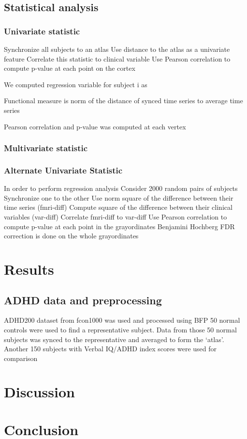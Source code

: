 \documentclass[preprint,12pt]{elsarticle}
\begin{document}
\subsection{Statistical analysis}
\subsubsection{Univariate statistic}
Synchronize all subjects to an atlas
Use distance to the atlas as a univariate feature
Correlate this statistic to clinical variable
Use Pearson correlation to compute p-value at each point on the cortex

We computed regression variable for subject i as 

Functional measure is norm of the distance of synced time series to average time series

Pearson correlation and p-value was computed at each vertex

\subsubsection{Multivariate statistic}

\subsubsection{Alternate Univariate Statistic}

In order to perform regression analysis
Consider 2000 random pairs of subjects
Synchronize one to the other 
Use norm square of the difference between their time series (fmri-diff)
Compute square of the difference between their clinical variables (var-diff)
Correlate fmri-diff to var-diff
Use Pearson correlation to compute p-value at each point in the grayordinates
Benjamini Hochberg FDR correction is done on the whole grayordinates


\section{Results}
\subsection{ADHD data and preprocessing}
ADHD200 dataset from fcon1000 was used and processed using BFP
50 normal controls were used to find a representative subject. Data from those  50 normal subjects was synced to the representative and averaged to form the ‘atlas’.
Another 150 subjects with Verbal IQ/ADHD index scores were used for comparison

\section{Discussion}

\section{Conclusion}
\label{S:2}





\end{document}
